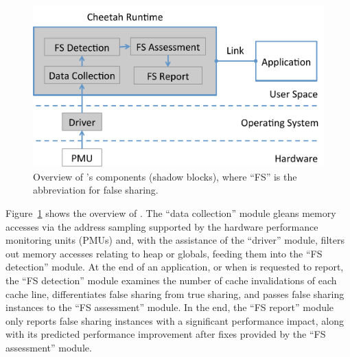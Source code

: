 \begin{figure}[htbp]
\centering
\includegraphics[width=1\columnwidth]{figure/cheetahcomponents}
\caption{Overview of \cheetah{}'s components (shadow blocks), where ``FS'' is the abbreviation for false sharing.}
\label{fig:components}
\end{figure}



%
Figure~\ref{fig:components} shows the overview of \Cheetah{}. 
The ``data collection'' module gleans memory accesses via the address sampling supported by the hardware performance monitoring units (PMUs) and, with the assistance of the ``driver'' module, filters out memory accesses relating to heap or globals, feeding them into the ``FS detection'' module. At the end of an application, or when \cheetah{} is requested to report, the ``FS detection'' module examines the number of cache invalidations of each cache line, differentiates false sharing from true sharing, and passes false sharing instances to the ``FS assessment'' module. In the end, the ``FS report'' module only reports false sharing instances with a significant performance impact, along with its predicted performance improvement after fixes provided by the ``FS assessment'' module. 

